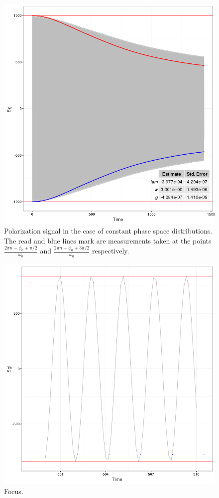 \documentclass{article}
\begin{document}
\begin{figure}[h]
	\centering
	\includegraphics[scale=.6]{../img/Sgl_PhysDistros}
	\caption{Polarization signal in the case of constant phase space distributions. The read and blue lines mark are measurements taken at the points $\frac{2\pi n - \phi_0 +\pi/2}{\omega_0}$ and $\frac{2\pi n - \phi_0 +3\pi/2}{\omega_0}$ respectively.\label{fig:Sgl_cDyPhys}}
\end{figure}
\begin{figure}[h]
	\centering
	\includegraphics[scale=.5]{../img/Peaks_after_Peaks}
	\caption{Focus.\label{fig:Focus}}
\end{figure}
\end{document}
